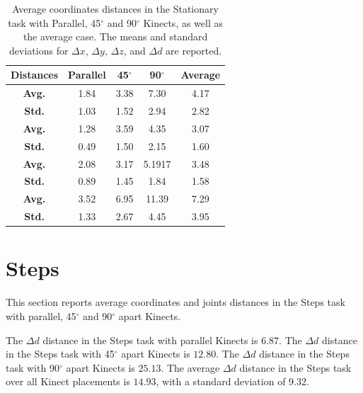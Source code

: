 \begin{table}[!h]
\centering
  
  \begin{tabulary}{1.0\linewidth}{||c c c c c||} 
   \hline
   \textbf{Distances} & \textbf{Parallel} & \textbf{45$^{\circ}$} & \textbf{90$^{\circ}$} & \textbf{Average} \\ [0.5ex] 
   \hline\hline
   \textbf{Avg.}  & 1.84 & 3.38 & 7.30 & 4.17 \\
   \hline
   \textbf{Std.}  & 1.03 & 1.52 & 2.94 & 2.82 \\
   \hline
   \textbf{Avg.}  & 1.28 & 3.59 & 4.35 & 3.07 \\
   \hline
   \textbf{Std.}  & 0.49 & 1.50 & 2.15 & 1.60 \\
   \hline
   \textbf{Avg.}  & 2.08 & 3.17 & 5.1917 & 3.48 \\
   \hline
   \textbf{Std.}  & 0.89 & 1.45 & 1.84 & 1.58 \\
   \hline
   \textbf{Avg.}  & 3.52 & 6.95 & 11.39 & 7.29 \\
   \hline
   \textbf{Std.}  & 1.33 & 2.67 & 4.45 & 3.95 \\
   \hline
  \end{tabulary}
  
  \caption{Average coordinates distances in the Stationary task with Parallel, 45$^{\circ}$ and 90$^{\circ}$ Kinects, as well as the average case. The means and standard deviations for $\Delta x$, $\Delta y$, $\Delta z$, and $\Delta d$ are reported.}
  
  \label{table:stationary_coordinates_values}
\end{table}

\section{Steps}
\label{sec:results_steps}

This section reports average coordinates and joints distances in the Steps task with parallel, 45$^{\circ}$ and 90$^{\circ}$ apart Kinects.

The $\Delta d$ distance in the Steps task with parallel Kinects is $6.87$. The $\Delta d$ distance in the Steps task with 45$^{\circ}$ apart Kinects is $12.80$. The $\Delta d$ distance in the Steps task with 90$^{\circ}$ apart Kinects is $25.13$. The average $\Delta d$ distance in the Steps task over all Kinect placements is $14.93$, with a standard deviation of $9.32$.

